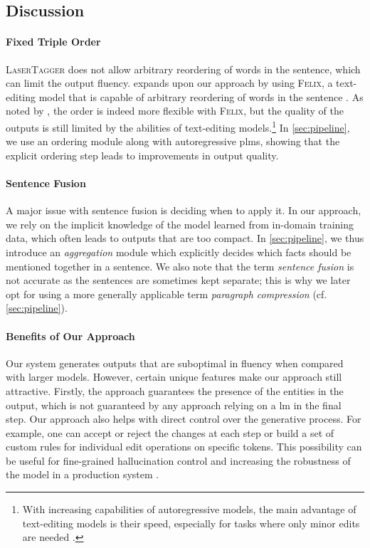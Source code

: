 \subsection{Discussion}
\label{sec:iterative:discussion}

\paragraph{Fixed Triple Order} \textsc{LaserTagger} does not allow arbitrary reordering of words in the sentence, which can limit the output fluency. \citet{grajcar2023data} expands upon our approach by using \textsc{Felix}, a text-editing model that is capable of arbitrary reordering of words in the sentence \cite{mallinsonFelixFlexibleText2020}. As noted by \citet{grajcar2023data}, the order is indeed more flexible with \textsc{Felix}, but the quality of the outputs is still limited by the abilities of text-editing models.\footnote{With increasing capabilities of autoregressive models, the main advantage of text-editing models is their speed, especially for tasks where only minor edits are needed \cite{malmi2022text}.} In \autoref{sec:pipeline}, we use an ordering module along with autoregressive \acp{plm}, showing that the explicit ordering step leads to improvements in output quality.

\paragraph{Sentence Fusion} A major issue with sentence fusion is deciding when to apply it. In our approach, we rely on the implicit knowledge of the model learned from in-domain training data, which often leads to outputs that are too compact. In \autoref{sec:pipeline}, we thus introduce an \emph{aggregation} module which explicitly decides which facts should be mentioned together in a sentence. We also note that the term \emph{sentence fusion} is not accurate as the sentences are sometimes kept separate; this is why we later opt for using a more generally applicable term \emph{paragraph compression} (cf. \autoref{sec:pipeline}).


\paragraph{Benefits of Our Approach} Our system generates outputs that are suboptimal in fluency when compared with larger models. However, certain unique features make our approach still attractive. Firstly, the approach guarantees the presence of the entities in the output, which is not guaranteed by any approach relying on a \ac{lm} in the final step. Our approach also helps with direct control over the generative process. For example, one can accept or reject the changes at each step or build a set of custom rules for individual edit operations on specific tokens. This possibility can be useful for fine-grained hallucination control \cite{rebuffel2021controlling,chen2023converge} and increasing the robustness of the model in a production system \cite{heidari2021getting,wang2023interactive}.




